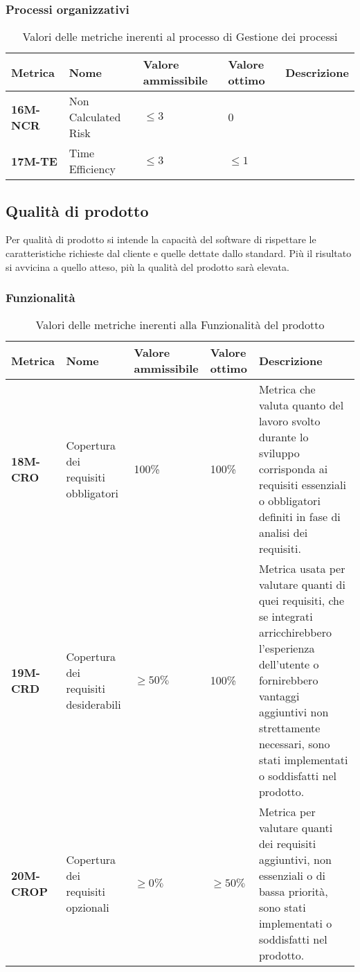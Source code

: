 \subsubsection{Processi organizzativi}
\begin{table}[h!]
	\centering
	\begin{tabularx}{\textwidth}{|X|X|X|X|X|} 	 
		\hline
		\textbf{Metrica} 	& \textbf{Nome} & \textbf{Valore ammissibile} & \textbf{Valore ottimo} & \textbf{Descrizione}\\  	 
		\hline
		\textbf{16M-NCR} & Non Calculated Risk & $\leq 3 $ & 0 &\\
		\hline
		\textbf{17M-TE} & Time Efficiency & $\leq 3 $ & $\leq 1 $ &\\
		\hline
	\end{tabularx}
	\caption{ Valori delle metriche inerenti al processo di Gestione dei processi}
	\label{table:6}
\end{table}
\subsection{Qualità di prodotto}
Per qualità di prodotto si intende la capacità del software di rispettare 
le caratteristiche richieste dal cliente e quelle dettate dallo standard.
Più il risultato si avvicina a quello atteso, più la qualità del prodotto
sarà elevata. 
\subsubsection{Funzionalità}
\begin{table}[h!]
	\centering
	\begin{tabularx}{\textwidth}{|X|X|X|X|X|} 	 
		\hline
		\textbf{Metrica} 	& \textbf{Nome} & \textbf{Valore ammissibile} & \textbf{Valore ottimo} & \textbf{Descrizione}\\  	 
		\hline
		\textbf{18M-CRO} & Copertura dei requisiti obbligatori & 100\%  & 100\% & Metrica che valuta quanto del lavoro svolto durante lo sviluppo corrisponda ai requisiti essenziali o obbligatori definiti in fase di analisi dei requisiti.\\
		\hline
		\textbf{19M-CRD} & Copertura dei requisiti desiderabili & $\geq 50\% $  & 100\% & Metrica usata per valutare quanti di quei requisiti, che se integrati arricchirebbero l'esperienza dell'utente o fornirebbero vantaggi aggiuntivi non strettamente necessari, sono stati implementati o soddisfatti nel prodotto.\\ 
		\hline
		\textbf{20M-CROP} & Copertura dei requisiti opzionali & $\geq 0\% $ & $\geq 50\% $ & Metrica per valutare quanti dei requisiti aggiuntivi, non essenziali o di bassa priorità, sono stati implementati o soddisfatti nel prodotto.\\ 
		\hline
	\end{tabularx}
	\caption{ Valori delle metriche inerenti alla Funzionalità del prodotto}
	\label{table:7}
\end{table}
